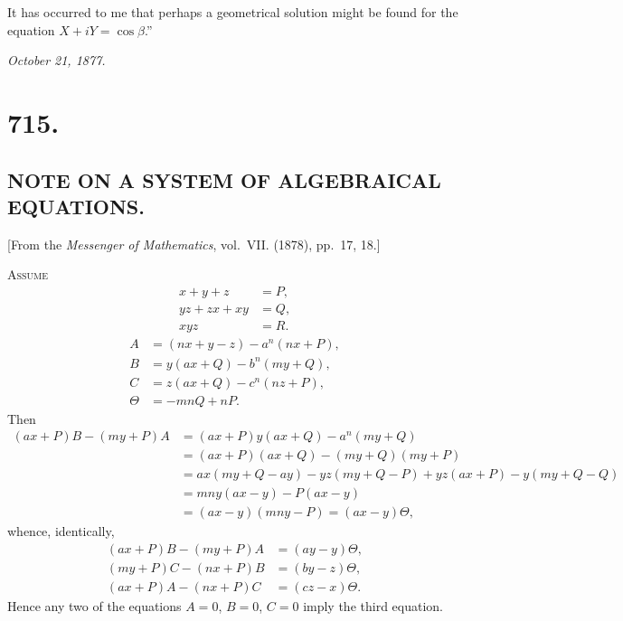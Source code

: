 \documentclass[12pt,a4paper,oneside]{book}
\theoremstyle{plain}
\theoremstyle{definition}
\theoremstyle{remark}
\begin{document}
It has occurred to me that perhaps a geometrical solution might be found for the equation $X+iY=\cos\beta$.''

\hfill\textit{October 21, 1877.}

\vspace{2em}
\noindent\dotfill

\newpage
\section*{715.}
\subsection*{NOTE ON A SYSTEM OF ALGEBRAICAL EQUATIONS.}

\begin{center}
\small [From the \textit{Messenger of Mathematics}, vol.~VII. (1878), pp.~17, 18.]
\end{center}

\medskip

\textsc{Assume}
\begin{align*}
x+y+z&=P,\\
yz+zx+xy&=Q,\\
xyz&=R.
\end{align*}
\begin{align*}
A&=(nx+y-z)-a^n(nx+P),\\
B&=y(ax+Q)-b^n(my+Q),\\
C&=z(ax+Q)-c^n(nz+P),\\
\Theta&=-mnQ+nP.
\end{align*}
Then
\begin{align*}
(ax+P)B-(my+P)A &=(ax+P)y(ax+Q)-a^n(my+Q)\\
&=(ax+P)(ax+Q)-(my+Q)(my+P)\\
&=ax(my+Q-ay)-yz(my+Q-P)+yz(ax+P)-y(my+Q-Q)\\
&=mny(ax-y)-P(ax-y)\\
&=(ax-y)(mny-P)=(ax-y)\Theta,
\end{align*}
whence, identically,
\begin{align*}
(ax+P)B-(my+P)A&=(ay-y)\Theta,\\
(my+P)C-(nx+P)B&=(by-z)\Theta,\\
(ax+P)A-(nx+P)C&=(cz-x)\Theta.
\end{align*}
Hence any two of the equations $A=0$, $B=0$, $C=0$ imply the third equation.
\end{document}
